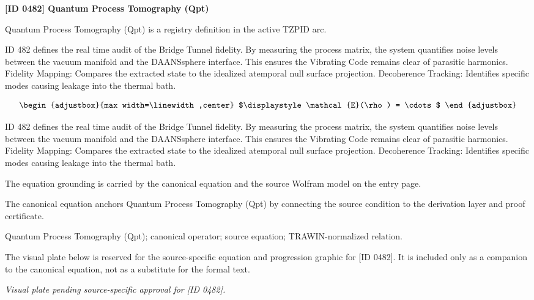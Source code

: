 \clearpage
\noindent\textbf{[ID 0482] Quantum Process Tomography (Qpt)}\par
\vspace{0.35em}
\begingroup\small
{}
Quantum Process Tomography (Qpt) is a registry definition in the active TZPID arc.

ID 482 defines the real time audit of the Bridge Tunnel fidelity. By measuring the process matrix, the system quantifies noise levels between the vacuum manifold and the DAANSsphere interface. This ensures the Vibrating Code remains clear of parasitic harmonics. Fidelity Mapping: Compares the extracted state to the idealized atemporal null surface projection. Decoherence Tracking: Identifies specific modes causing leakage into the thermal bath.

\[
\begin{adjustbox}{max width=\linewidth,center}
$\displaystyle
\mathcal{E}(\rho) = \cdots
$
\end{adjustbox}
\]

ID 482 defines the real time audit of the Bridge Tunnel fidelity. By measuring the process matrix, the system quantifies noise levels between the vacuum manifold and the DAANSsphere interface. This ensures the Vibrating Code remains clear of parasitic harmonics. Fidelity Mapping: Compares the extracted state to the idealized atemporal null surface projection. Decoherence Tracking: Identifies specific modes causing leakage into the thermal bath.

The equation grounding is carried by the canonical equation and the source Wolfram model on the entry page.

The canonical equation anchors Quantum Process Tomography (Qpt) by connecting the source condition to the derivation layer and proof certificate.

Quantum Process Tomography (Qpt); canonical operator; source equation; TRAWIN-normalized relation.
\endgroup

\begingroup\footnotesize\sloppy
The visual plate below is reserved for the source-specific equation and progression graphic for [ID 0482]. It is included only as a companion to the canonical equation, not as a substitute for the formal text.
\par\endgroup
\begingroup\footnotesize\itshape
Visual plate pending source-specific approval for [ID 0482].
\par\endgroup


